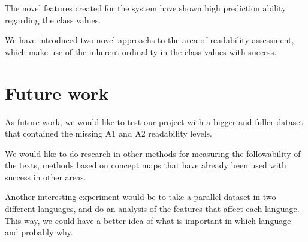 \documentclass{acm_proc_article-sp}
\begin{document}
The novel features created for the system have shown high prediction ability regarding the class values.

We have introduced two novel approachs to the area of readability assessment, which make use of the inherent ordinality in the class values with success. 



\section{Future work}


As future work, we would like to test our project with a bigger and fuller dataset that contained the missing A1 and A2 readability levels.

We would like to do research in other methods for measuring the followability of the texts, methods based on concept maps that have already been used with success in other areas.

Another interesting experiment would be to take a parallel dataset in two different languages, and do an analysis of the features that affect each language. This way, we could have a better idea of what is important in which language and probably why.










%
\nocite{*}

%
%
\end{document}
